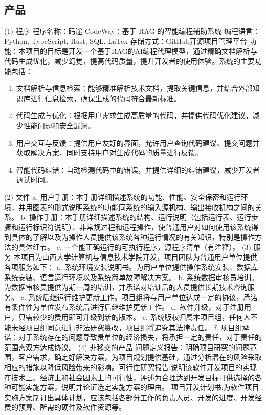 \documentclass[
    report,     %
    oneside,    %
    UTF8,       %
    zihao=-4    %
]{config} %
\begin{document}
\subsection{产品}
(1) 程序
程序名称：码途 CodeWay：基于 RAG 的智能编程辅助系统
编程语言：Python, TypeScript, Rust, SQL, LaTex
存储方式：GitHub开源项目管理平台
功能：本项目的目标是开发一个基于RAG的AI编程代理模型，通过精确文档解析与代码生成优化，减少幻觉，提高代码质量，提升开发者的使用体验。系统的主要功能包括：
\begin{enumerate}
    \item 文档解析与信息检索：能够精准解析技术文档，提取关键信息，并结合外部知识库进行信息检索，确保生成的代码符合最新标准。
    \item 代码生成与优化：根据用户需求生成高质量的代码，并提供代码优化建议，减少性能问题和安全漏洞。
    \item 用户交互与反馈：提供用户友好的界面，允许用户查询代码建议、提交问题并获取解决方案，同时支持用户对生成代码的质量进行反馈。
    \item 智能代码纠错：自动检测代码中的错误，并提供详细的纠错建议，减少开发者调试时间。
\end{enumerate}
(2) 文件
a. 用户手册：本手册详细描述系统的功能、性能、安全保密和运行环境，并用图表的形式说明系统的功能同系统的输入源机构、输出接收机构之间的关系。
b. 操作手册：本手册详细描述系统的结构、运行说明（包括运行表、运行步骤和运行标识符说明）、非常规过程和远程操作，使普通用户对如何使用该系统得到具体的了解以及为操作人员提供该系统各种运行情况的有关知识，特别是操作方法的具体细节。
c. 一个能正确运行的可执行程序，源程序清单（有注释）。
(3) 服务
本项目为山西大学计算机与信息技术学院开发，项目团队为普通用户单位提供各项服务如下：
a. 系统环境安装说明书。为用户单位提供操作系统安装、数据库系统安装、语言运行环境以及系统简单故障解决方案。
b. 系统数据审核员培训。为数据审核员提供为期一周的培训，并承诺对培训后的人员提供长期技术咨询服务。
c. 系统后继运行维护更新工作。项目组将与用户单位达成一定的协议，承诺有条件性为单位发布系统后进行后继维护更新工作。
d. 软件升级，对于注册用户，只需较少的费用即可升级到新的版本。
e. 系统版权归属本项目组，任何人不能未经项目组同意进行非法研究篡改，项目组将追究其法律责任。
f. 项目组承诺：对于系统存在的问题导致贵单位的经济损失，将承担一定的责任，对于责任的范围需双方达成协议。
(4) 非移交的产品
问题定义报告：明确项目研究的问题范围，客户需求，确定好解决方案，为项目规划提供基础，通过分析潜在的风险采取相应的措施以降低风险带来的影响。可行性研究报告:说明该软件开发项目的实现在技术上、经济上和社会因素上的可行性，评述为合理达到开发目标可供选择的各种可能实施方案，说明并论证选定实施方案的理由。
项目开发计划书:为软件项目实施方案制订出具体计划，应该包括各部分工作的负责人员、开发的进度、开发经费的预算、所需的硬件及软件资源等。
\end{document}
